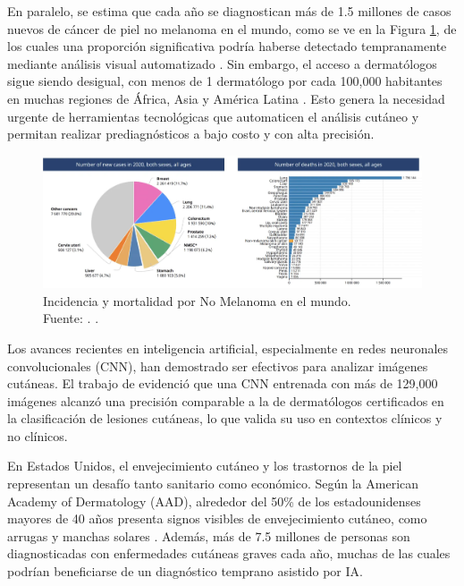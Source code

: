 En paralelo, se estima que cada año se diagnostican más de 1.5 millones de casos nuevos de cáncer de piel no melanoma en el mundo, como se ve en la Figura \ref{1:figcancer}, de los cuales una proporción significativa podría haberse detectado tempranamente mediante análisis visual automatizado \parencite{globalcancer2020}. Sin embargo, el acceso a dermatólogos sigue siendo desigual, con menos de 1 dermatólogo por cada 100,000 habitantes en muchas regiones de África, Asia y América Latina \parencite{who2020workforce}. Esto genera la necesidad urgente de herramientas tecnológicas que automaticen el análisis cutáneo y permitan realizar prediagnósticos a bajo costo y con alta precisión.

\begin{figure}[H]
	\begin{center}
		\includegraphics[width=1\textwidth]{1/figures/cancerpiel.png}
		\caption[Incidencia y mortalidad por No Melanoma en el mundo]{Incidencia y mortalidad por No Melanoma en el mundo.\\
			Fuente: \cite{gco}. .}
		\label{1:figcancer}
	\end{center}
\end{figure}

Los avances recientes en inteligencia artificial, especialmente en redes neuronales convolucionales (CNN), han demostrado ser efectivos para analizar imágenes cutáneas. El trabajo de \cite{esteva2017} evidenció que una CNN entrenada con más de 129,000 imágenes alcanzó una precisión comparable a la de dermatólogos certificados en la clasificación de lesiones cutáneas, lo que valida su uso en contextos clínicos y no clínicos.

En Estados Unidos, el envejecimiento cutáneo y los trastornos de la piel representan un desafío tanto sanitario como económico. Según la American Academy of Dermatology (AAD), alrededor del 50\% de los estadounidenses mayores de 40 años presenta signos visibles de envejecimiento cutáneo, como arrugas y manchas solares \parencite{aad2023aging}. Además, más de 7.5 millones de personas son diagnosticadas con enfermedades cutáneas graves cada año, muchas de las cuales podrían beneficiarse de un diagnóstico temprano asistido por IA.

